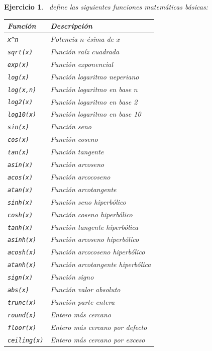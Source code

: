 \documentclass[11pt,a4paper]{article}
\newcommand{\R}{\textcolor{azuluc}{\faIcon{r-project}}}
\theoremstyle{exercise}
\newtheorem{exercise}{Ejercicio}
\begin{document}
\newpage
\begin{exercise} \R\ define las siguientes funciones matemáticas básicas:
\begin{center}
	\begin{tabular}{|l|l|} \hline
		\textbf{Función} & \textbf{Descripción} \\ \hline
		\verb|x^n| & Potencia $n$-ésima de $x$ \\
		\texttt{sqrt(x)} & Función raíz cuadrada \\
		\texttt{exp(x)} & Función exponencial \\
		\texttt{log(x)} & Función logaritmo neperiano \\
		\texttt{log(x,n)} & Función logaritmo en base $n$ \\
		\texttt{log2(x)} & Función logaritmo en base 2 \\
		\texttt{log10(x)} & Función logaritmo en base 10 \\
		\texttt{sin(x)} & Función seno \\
		\texttt{cos(x)} & Función coseno \\
		\texttt{tan(x)} & Función tangente \\
		\texttt{asin(x)} & Función arcoseno \\
		\texttt{acos(x)} & Función arcocoseno \\
		\texttt{atan(x)} & Función arcotangente \\
		\texttt{sinh(x)} & Función seno hiperbólico \\
		\texttt{cosh(x)} & Función coseno hiperbólico \\
		\texttt{tanh(x)} & Función tangente hiperbólica \\
		\texttt{asinh(x)} & Función arcoseno hiperbólico \\
		\texttt{acosh(x)} & Función arcocoseno hiperbólico \\
		\texttt{atanh(x)} & Función arcotangente hiperbólica \\
		\texttt{sign(x)} & Función signo \\
		\texttt{abs(x)} & Función valor absoluto \\
		\texttt{trunc(x)} & Función parte entera \\
		\texttt{round(x)} & Entero más cercano \\
		\texttt{floor(x)} & Entero más cercano por defecto \\
		\texttt{ceiling(x)} & Entero más cercano por exceso \\ \hline
	\end{tabular}
\end{center}


\end{exercise}
\end{document}
